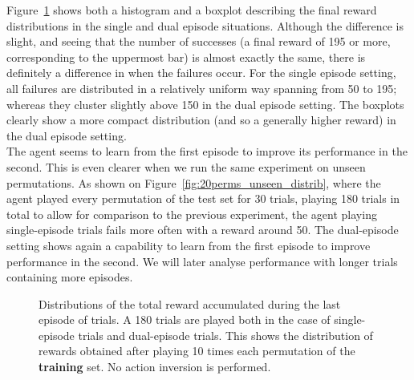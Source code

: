 Figure~\ref{fig:20perms_distrib} shows both a histogram and a boxplot describing
the final reward distributions in the single and dual episode situations. 
Although the difference is slight, and seeing that the number
of successes (a final reward of 195 or more, corresponding to the uppermost
bar) is almost exactly the same, there is definitely a difference in when the
failures occur. For the single episode setting, all failures are distributed
in a relatively uniform way spanning from 50 to 195; whereas they cluster 
slightly above 150 in the dual episode setting. The boxplots clearly show
a more compact distribution (and so a generally higher reward) in the dual
episode setting.\\

The agent seems to learn from the first episode to improve its performance in
the second. This is even clearer when we run the same experiment on unseen
permutations. As shown on Figure~\ref{fig:20perms_unseen_distrib}, where the
agent played every permutation of the test set for 30 trials, playing 180
trials in total to allow for comparison to the previous experiment, the agent
playing single-episode trials fails more often with a reward around 50. The
dual-episode setting shows again a capability to learn from the first episode
to improve performance in the second. We will later analyse performance
with longer trials containing more episodes.\\

\begin{figure}
	\centering
	\caption{Distributions of the total reward accumulated during the last
	episode of trials. A 180 trials are played both in the case of
	single-episode trials and dual-episode trials. This shows the
	distribution of rewards obtained after playing 10 times each
	permutation of the \textbf{training} set. No action inversion is performed.}
	\label{fig:20perms_distrib}
\end{figure}

